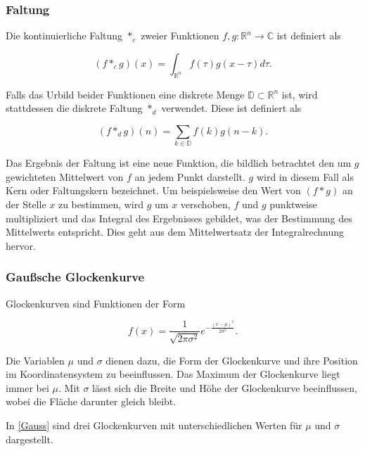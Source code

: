 \documentclass[a4paper,fontsize=12pt,toc=bib,parskip=half,ngerman]{scrartcl}
\begin{document}
\subsubsection{Faltung}
Die kontinuierliche Faltung $*_c$ zweier Funktionen $f,g:\mathbb{R}^n\rightarrow\mathbb{C}$ ist definiert als

\begin{equation}
(f*_cg)(x) = \int_{\mathbb{R}^n} f(\tau)g(x-\tau)d\tau.
\end{equation}

Falls das Urbild beider Funktionen eine diskrete Menge $\mathbb{D} \subset \mathbb{R}^n$ ist, wird stattdessen die diskrete Faltung $*_d$ verwendet. Diese ist definiert als

\begin{equation}
(f*_dg)(n) = \sum_{k\in\mathbb{D}}f(k)g(n-k).
\end{equation}

Das Ergebnis der Faltung ist eine neue Funktion, die bildlich betrachtet den um $g$ gewichteten Mittelwert von $f$ an jedem Punkt darstellt. $g$ wird in diesem Fall als Kern oder Faltungskern bezeichnet. Um beispielsweise den Wert von $(f*g)$ an der Stelle $x$ zu bestimmen, wird $g$ um $x$ verschoben, $f$ und $g$ punktweise multipliziert und das Integral des Ergebnisses gebildet, was der Bestimmung des Mittelwerts entspricht. Dies geht aus dem Mittelwertsatz der Integralrechnung hervor.

\subsubsection{Gau{\ss}sche Glockenkurve}
Glockenkurven sind Funktionen der Form 

\begin{equation}
f(x) = \frac{1}{\sqrt{2\pi \sigma^2}}e^{-\frac{(x-\mu)^2}{2\sigma^2}}.
\end{equation}

Die Variablen $\mu$ und $\sigma$ dienen dazu, die Form der Glockenkurve und ihre Position im Koordinatensystem zu beeinflussen. Das Maximum der Glockenkurve liegt immer bei $\mu$. Mit $\sigma$ l\"asst sich die Breite und H\"ohe der Glockenkurve beeinflussen, wobei die Fl\"ache darunter gleich bleibt.

In \cref{Gauss} sind drei Glockenkurven mit unterschiedlichen Werten f\"ur $\mu$ und $\sigma$ dargestellt.

\end{document}
